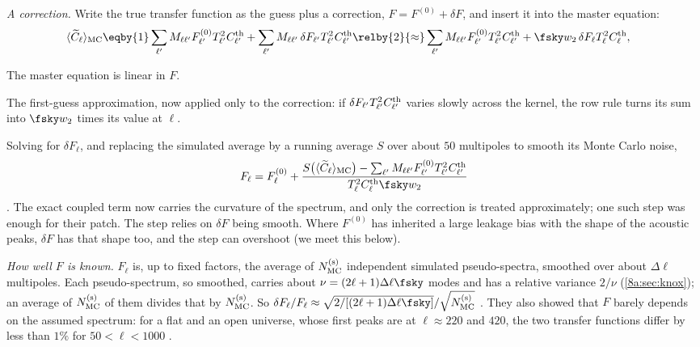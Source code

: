 \emph{A correction.} Write the true transfer function as the guess plus a correction, $F=F^{(0)}+\delta F$, and
insert it into the master equation:
\begin{align*}
  \langle\widetilde C_\ell\rangle_{\rm MC}
  &\eqby{1}\sum_{\ell'}M_{\ell\ell'}F^{(0)}_{\ell'}T^2_{\ell'}C^{\rm th}_{\ell'}+\sum_{\ell'}M_{\ell\ell'}\,\delta F_{\ell'}T^2_{\ell'}C^{\rm th}_{\ell'}
   \relby{2}{\approx}\sum_{\ell'}M_{\ell\ell'}F^{(0)}_{\ell'}T^2_{\ell'}C^{\rm th}_{\ell'}+\fsky w_2\,\delta F_\ell T^2_\ell C^{\rm th}_\ell ,
\end{align*}
\begin{explain}
  \item The master equation is linear in $F$.
  \item The first-guess approximation, now applied only to the correction: if $\delta F_{\ell'}T^2_{\ell'}C^{\rm th}_{\ell'}$
        varies slowly across the kernel, the row rule turns its sum into $\fsky w_2$ times its value at $\ell$.
\end{explain}
Solving for $\delta F_\ell$, and replacing the simulated average by a running average $S$ over about $50$
multipoles to smooth its Monte Carlo noise,
\begin{equation}
  F_\ell=F^{(0)}_\ell+\frac{S\bigl(\langle\widetilde C_\ell\rangle_{\rm MC}\bigr)-\sum_{\ell'}M_{\ell\ell'}F^{(0)}_{\ell'}T^2_{\ell'}C^{\rm th}_{\ell'}}
  {T^2_\ell C^{\rm th}_\ell\fsky w_2}
  \label{8b:eq:F-iter}
\end{equation}
. The exact coupled term now carries the curvature of the spectrum, and only the
correction is treated approximately; one such step was enough for their patch. The step relies on
$\delta F$ being smooth. Where $F^{(0)}$ has inherited a large leakage bias with the shape of the acoustic
peaks, $\delta F$ has that shape too, and the step can overshoot (we meet this below).

\emph{How well $F$ is known.} $F_\ell$ is, up to fixed factors, the average of $N^{(\rm s)}_{\rm MC}$ independent simulated
pseudo-spectra, smoothed over about $\Delta\ell$ multipoles. Each pseudo-spectrum, so smoothed, carries about
$\nu=(2\ell+1)\Delta\ell\fsky$ modes and has a relative variance $2/\nu$ (\cref{8a:sec:knox}); an average of
$N^{(\rm s)}_{\rm MC}$ of them divides that by $N^{(\rm s)}_{\rm MC}$. So
$\delta F_\ell/F_\ell\approx\sqrt{2/[(2\ell+1)\Delta\ell\fsky]}/\sqrt{N^{(\rm s)}_{\rm MC}}$ . They also showed that $F$ barely depends on the assumed spectrum: for a flat and
an open universe, whose first peaks are at $\ell\approx220$ and $420$, the two transfer functions differ by
less than $1\%$ for $50<\ell<1000$ .

